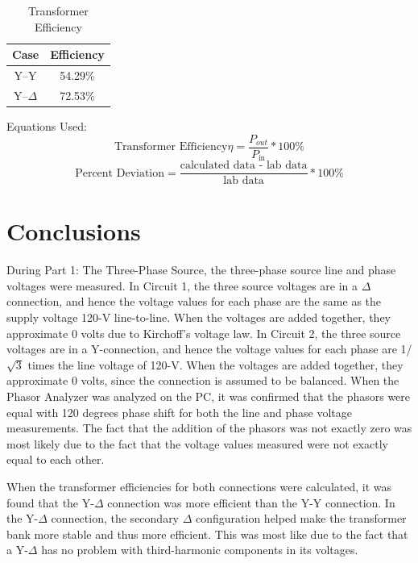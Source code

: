 \documentclass{article}
\begin{document}
\begin{table}[H]
  \centering
  \begin{tabular}{*{2}{c}}
    \textbf{Case} & \textbf{Efficiency} \\

    \hline

    Y--Y        & 54.29\% \\
    Y--$\Delta$ & 72.53\% \\
  \end{tabular}
  \caption{Transformer Efficiency}
  \label{tab:efficiency}
\end{table}



Equations Used:
\[\text{Transformer Efficiency}\eta = \frac{P_{out}}{P_\text{in}} * 100\% \]
\[\text{Percent Deviation} = \frac{\text{calculated data - lab data}}{\text{lab data}} * 100\%\]

\section{Conclusions} During Part 1: The Three-Phase Source, the three-phase
source line and phase voltages were measured. In Circuit 1, the three source
voltages are in a $\Delta$ connection, and hence the voltage values for each
phase are the same as the supply voltage 120-V line-to-line. When the voltages
are added together, they approximate 0 volts due to Kirchoff's voltage law. In
Circuit 2, the three source voltages are in a Y-connection, and hence the
voltage values for each phase are 1/$\sqrt{3}$ times the line voltage of 120-V.
When the voltages are added together, they approximate 0 volts, since the
connection is assumed to be balanced. When the Phasor Analyzer was analyzed on
the PC, it was confirmed that the phasors were equal with 120 degrees phase
shift for both the line and phase voltage measurements. The fact that the
addition of the phasors was not exactly zero was most likely due to the fact
that the voltage values measured were not exactly equal to each other.

When the transformer efficiencies for both connections were calculated, it was
found that the Y-$\Delta$ connection was more efficient than the Y-Y
connection. In the Y-$\Delta$ connection, the secondary $\Delta$ configuration
helped make the transformer bank more stable and thus more efficient. This was
most like due to the fact that a Y-$\Delta$ has no problem with third-harmonic
components in its voltages.
\end{document}
